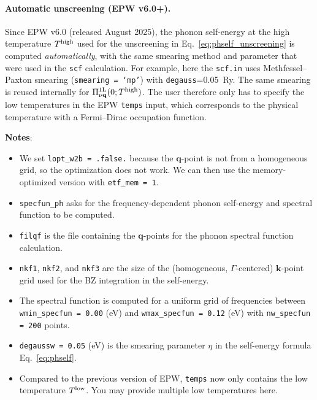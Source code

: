 \documentclass[a4paper,11pt,serif]{article}
\newcommand{\Eq}[1]{{Eq.~\eqref{#1}}}
\newcommand{\mb}[1]{\mathbf{#1}}
\newcommand{\nuq}[0]{{\nu\mb{q}}}
\begin{document}
\paragraph{Automatic unscreening (EPW v6.0+).}
Since EPW v6.0 (released August 2025), the phonon self-energy at the high temperature $T^{\rm high}$ used for the unscreening in \Eq{eq:phself_unscreening} is computed \emph{automatically}, with the same smearing method and parameter that were used in the \texttt{scf} calculation.
%
For example, here the \texttt{scf.in} uses Methfessel--Paxton smearing (\texttt{smearing = `mp'}) with \texttt{degauss}=0.05~Ry.
%
The same smearing is reused internally for $\Pi^{\rm 1L}_\nuq(0; T^{\rm high})$.
%
The user therefore only has to specify the low temperatures in the EPW \texttt{temps} input, which corresponds to the physical temperature with a Fermi--Dirac occupation function.

\vspace{0.2cm}

\begin{footnotesize}
   {\bf Notes}:
   \begin{itemize}
      \item We set \texttt{lopt\_w2b = .false.} because the $\mb{q}$-point is not from a homogeneous grid, so the optimization does not work. We can then use the memory-optimized version with \texttt{etf\_mem = 1}.
      \item \texttt{specfun\_ph} asks for the frequency-dependent phonon self-energy and spectral function to be computed.
      \item \texttt{filqf} is the file containing the $\mb{q}$-points for the phonon spectral function calculation.
      \item \texttt{nkf1}, \texttt{nkf2}, and \texttt{nkf3} are the size of the (homogeneous, $\Gamma$-centered) $\mb{k}$-point grid used for the BZ integration in the self-energy.
      \item The spectral function is computed for a uniform grid of frequencies between \texttt{wmin\_specfun = 0.00} (eV) and \texttt{wmax\_specfun = 0.12} (eV) with \texttt{nw\_specfun = 200} points.
      \item \texttt{degaussw = 0.05} (eV) is the smearing parameter $\eta$ in the self-energy formula Eq.~\eqref{eq:phself}.
      \item Compared to the previous version of EPW, \texttt{temps} now only contains the low temperature $T^{\rm low}$. You may provide multiple low temperatures here.
   \end{itemize}
\end{footnotesize}
\end{document}

